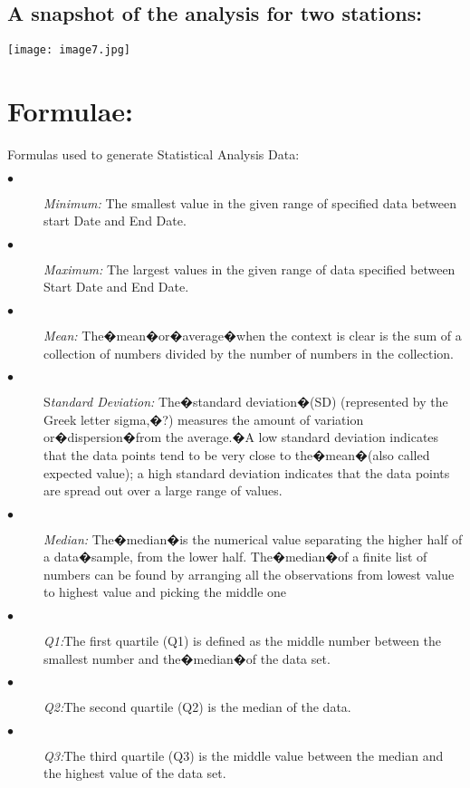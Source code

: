 \documentclass[a4paper]{article}
\begin{document}
\subsection*{A snapshot of the analysis for two stations:}
\begin{center}
\texttt{[image: image7.jpg]}
\end{center}
\begin{minipage}[t]{0.45\textwidth}
\bigskip
\section*{Formulae:}
{\normalsize Formulas used to generate Statistical Analysis Data:
 \begin{description}
  \item[$\bullet$ ] \textit{Minimum: }The smallest value in the given range of specified data between start Date and End Date.
  \item[$\bullet$ ] \textit{Maximum: }The largest values in the given range of data specified between Start Date and End Date.
  \item[$\bullet$ ] \textit{Mean:} The�mean�or�average�when the context is clear is the sum of a collection of numbers divided by the number of numbers in the collection.
   \item[$\bullet$ ] S\textit{tandard Deviation: }The�standard deviation�(SD) (represented by the Greek letter sigma,�?) measures the amount of variation or�dispersion�from the average.�A low standard deviation indicates that the data points tend to be very close to the�mean�(also called expected value); a high standard deviation indicates that the data points are spread out over a large range of values.
   \item[$\bullet$ ]  \textit{Median:} The�median�is the numerical value separating the higher half of a data�sample, from the lower half. The�median�of a finite list of numbers can be found by arranging all the observations from lowest value to highest value and picking the middle one
    \item[$\bullet$ ]  \textit{Q1:}The first quartile (Q1) is defined as the middle number between the smallest number and the�median�of the data set.
     \item[$\bullet$ ]  \textit{Q2:}The second quartile (Q2) is the median of the data.
      \item[$\bullet$ ]  \textit{Q3:}The third quartile (Q3) is the middle value between the median and the highest value of the data set.
   \end{description}
   }
   \end{minipage}
   \hspace{.5cm}
\begin{minipage}[t]{0.45\textwidth}
\bigskip
\nocite{*}


\end{minipage}
\end{document}
